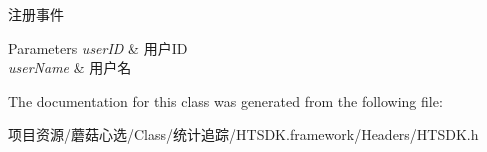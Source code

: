 注册事件


\begin{DoxyParams}{Parameters}
{\em user\+ID} & 用户\+ID \\
\hline
{\em user\+Name} & 用户名 \\
\hline
\end{DoxyParams}


The documentation for this class was generated from the following file\+:\begin{DoxyCompactItemize}
\item 
项目资源/蘑菇心选/\+Class/统计追踪/\+H\+T\+S\+D\+K.\+framework/\+Headers/H\+T\+S\+D\+K.\+h\end{DoxyCompactItemize}
